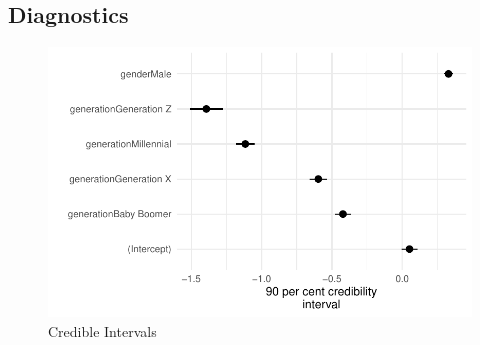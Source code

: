 \documentclass[
  letterpaper,
  DIV=11,
  numbers=noendperiod]{scrartcl}
\begin{document}
\hypertarget{diagnostics}{%
\subsection{Diagnostics}\label{diagnostics}}

\begin{figure}

{\centering \includegraphics{paper_files/figure-pdf/fig-model-cred-interval-1.pdf}

}

\caption{\label{fig-model-cred-interval}Credible Intervals}

\end{figure}
\end{document}
